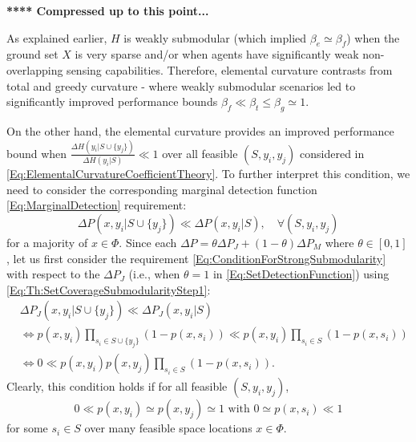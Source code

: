\documentclass[letterpaper, 10 pt, conference]{ieeeconf}
\begin{document}


\bigskip
{\color{blue} \textbf{**** Compressed up to this point...} }
\bigskip

As explained earlier, $H$ is weakly submodular (which implied $\beta_e \simeq \beta_f$) when the ground set $X$ is very sparse and/or when agents have significantly weak non-overlapping sensing capabilities. Therefore, elemental curvature contrasts from total and greedy curvature - where weakly submodular scenarios led to significantly improved performance bounds $\beta_f \ll \beta_t \leq \beta_g \simeq 1$.


On the other hand, the elemental curvature provides an improved performance bound when $\frac{\Delta H(y_i \vert S \cup \{y_j\})}{\Delta H(y_i \vert S)} \ll 1$ over all feasible $(S,y_i,y_j)$ considered in \eqref{Eq:ElementalCurvatureCoefficientTheory}. To further interpret this condition, we need to consider the corresponding marginal detection function \eqref{Eq:MarginalDetection} requirement:
\begin{equation}\label{Eq:ConditionForStrongSubmodularity}
\Delta P(x,y_i \vert S \cup \{y_j\}) \ll \Delta P(x, y_i \vert S), \quad \forall (S,y_i,y_j)    
\end{equation}
for a majority of $x\in\Phi$. Since each $\Delta P = \theta \Delta P_J + (1-\theta)\Delta P_M$ where $\theta \in [0,1]$, let us first consider the requirement \eqref{Eq:ConditionForStrongSubmodularity} with respect to the $\Delta P_J$ (i.e., when $\theta = 1$ in \eqref{Eq:SetDetectionFunction}) using \eqref{Eq:Th:SetCoverageSubmodularityStep1}:
\begin{align}
    &\Delta P_J(x,y_i \vert S \cup \{y_j\}) \ll \Delta P_J(x, y_i \vert S) \nonumber\\
    &\iff p(x,y_i)\prod_{s_i\in S\cup\{y_j\}}(1-p(x,s_i))\ll 
    p(x,y_i)\prod_{s_i\in S}(1-p(x,s_i))\nonumber\\
    &\iff 0 \ll p(x,y_i)p(x,y_j)\prod_{s_i\in S}(1-p(x,s_i)). \nonumber
\end{align}
Clearly, this condition holds if for all feasible $(S,y_i,y_j)$, 
\begin{equation}\label{Eq:ConditionForStrongSubmodularity1}
    0 \ll p(x,y_i) \simeq p(x,y_j) \simeq 1 \mbox{ with } 0 \simeq p(x,s_i) \ll 1
\end{equation}
for some $s_i\in S$ over many feasible space locations $x\in\Phi$.
\end{document}
